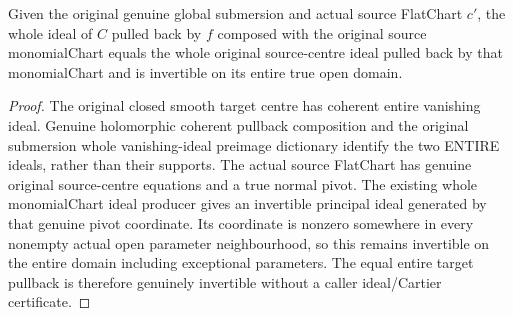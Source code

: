 \begin{lemma}
\label{hir:submersion-global-lift-entire-chart-ideal}
\leanok
{}
Given the original genuine global submersion and actual source FlatChart $c'$, the whole ideal of $C$ pulled back by $f$ composed with the original source monomialChart equals the whole original source-centre ideal pulled back by that monomialChart and is invertible on its entire true open domain.
\end{lemma}
\begin{proof}
The original closed smooth target centre has coherent entire vanishing ideal. Genuine holomorphic coherent pullback composition and the original submersion whole vanishing-ideal preimage dictionary identify the two ENTIRE ideals, rather than their supports. The actual source FlatChart has genuine original source-centre equations and a true normal pivot. The existing whole monomialChart ideal producer gives an invertible principal ideal generated by that genuine pivot coordinate. Its coordinate is nonzero somewhere in every nonempty actual open parameter neighbourhood, so this remains invertible on the entire domain including exceptional parameters. The equal entire target pullback is therefore genuinely invertible without a caller ideal/Cartier certificate.
\end{proof}

